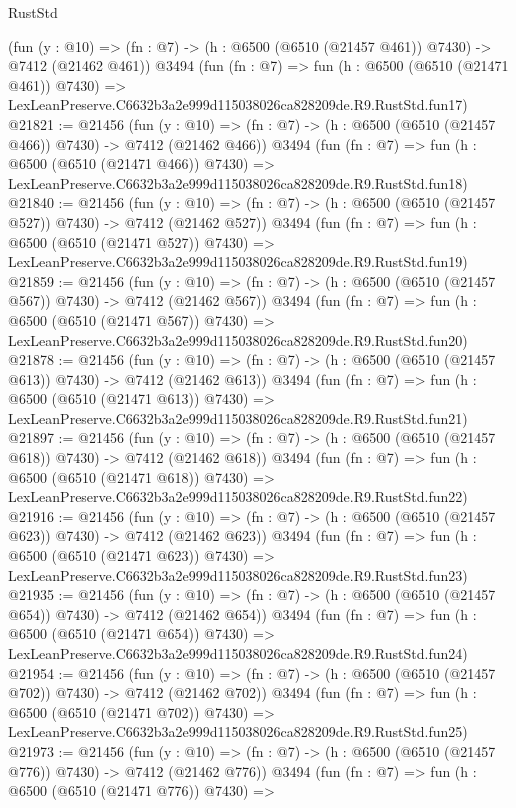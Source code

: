 \begin{lexlean}{RustStd}
\begin{coremodule}
    (fun (y : @10) => (fn : @7) -> (h : @6500 (@6510 (@21457 @461)) @7430) -> @7412 (@21462 @461))
    @3494
    (fun (fn : @7) =>
    fun (h : @6500 (@6510 (@21471 @461)) @7430) =>
    LexLeanPreserve.C6632b3a2e999d115038026ca828209de.R9.RustStd.fun17)
@21821 := @21456
    (fun (y : @10) => (fn : @7) -> (h : @6500 (@6510 (@21457 @466)) @7430) -> @7412 (@21462 @466))
    @3494
    (fun (fn : @7) =>
    fun (h : @6500 (@6510 (@21471 @466)) @7430) =>
    LexLeanPreserve.C6632b3a2e999d115038026ca828209de.R9.RustStd.fun18)
@21840 := @21456
    (fun (y : @10) => (fn : @7) -> (h : @6500 (@6510 (@21457 @527)) @7430) -> @7412 (@21462 @527))
    @3494
    (fun (fn : @7) =>
    fun (h : @6500 (@6510 (@21471 @527)) @7430) =>
    LexLeanPreserve.C6632b3a2e999d115038026ca828209de.R9.RustStd.fun19)
@21859 := @21456
    (fun (y : @10) => (fn : @7) -> (h : @6500 (@6510 (@21457 @567)) @7430) -> @7412 (@21462 @567))
    @3494
    (fun (fn : @7) =>
    fun (h : @6500 (@6510 (@21471 @567)) @7430) =>
    LexLeanPreserve.C6632b3a2e999d115038026ca828209de.R9.RustStd.fun20)
@21878 := @21456
    (fun (y : @10) => (fn : @7) -> (h : @6500 (@6510 (@21457 @613)) @7430) -> @7412 (@21462 @613))
    @3494
    (fun (fn : @7) =>
    fun (h : @6500 (@6510 (@21471 @613)) @7430) =>
    LexLeanPreserve.C6632b3a2e999d115038026ca828209de.R9.RustStd.fun21)
@21897 := @21456
    (fun (y : @10) => (fn : @7) -> (h : @6500 (@6510 (@21457 @618)) @7430) -> @7412 (@21462 @618))
    @3494
    (fun (fn : @7) =>
    fun (h : @6500 (@6510 (@21471 @618)) @7430) =>
    LexLeanPreserve.C6632b3a2e999d115038026ca828209de.R9.RustStd.fun22)
@21916 := @21456
    (fun (y : @10) => (fn : @7) -> (h : @6500 (@6510 (@21457 @623)) @7430) -> @7412 (@21462 @623))
    @3494
    (fun (fn : @7) =>
    fun (h : @6500 (@6510 (@21471 @623)) @7430) =>
    LexLeanPreserve.C6632b3a2e999d115038026ca828209de.R9.RustStd.fun23)
@21935 := @21456
    (fun (y : @10) => (fn : @7) -> (h : @6500 (@6510 (@21457 @654)) @7430) -> @7412 (@21462 @654))
    @3494
    (fun (fn : @7) =>
    fun (h : @6500 (@6510 (@21471 @654)) @7430) =>
    LexLeanPreserve.C6632b3a2e999d115038026ca828209de.R9.RustStd.fun24)
@21954 := @21456
    (fun (y : @10) => (fn : @7) -> (h : @6500 (@6510 (@21457 @702)) @7430) -> @7412 (@21462 @702))
    @3494
    (fun (fn : @7) =>
    fun (h : @6500 (@6510 (@21471 @702)) @7430) =>
    LexLeanPreserve.C6632b3a2e999d115038026ca828209de.R9.RustStd.fun25)
@21973 := @21456
    (fun (y : @10) => (fn : @7) -> (h : @6500 (@6510 (@21457 @776)) @7430) -> @7412 (@21462 @776))
    @3494
    (fun (fn : @7) =>
    fun (h : @6500 (@6510 (@21471 @776)) @7430) =>

\end{coremodule}
\end{lexlean}
